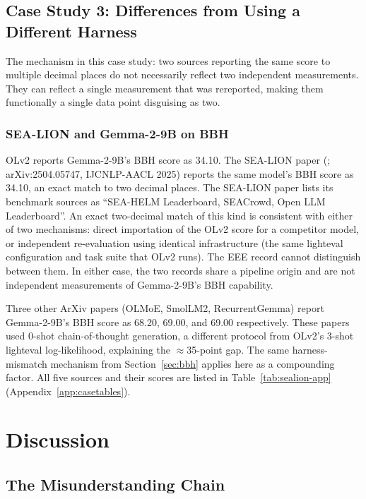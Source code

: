 \documentclass[11pt]{article}
\begin{document}
\subsection{Case Study 3: Differences from Using a Different Harness}
\label{sec:convergence}

The mechanism in this case study: two sources reporting the same score to
multiple decimal places do not necessarily reflect two independent
measurements. They can reflect a single measurement that was rereported,
making them functionally a single data point disguising as two.

\subsubsection{SEA-LION and Gemma-2-9B on BBH}
\label{sec:sealion}

OLv2 reports Gemma-2-9B's BBH score as 34.10. The SEA-LION paper
(\citealt{ng2025sealion}; arXiv:2504.05747, IJCNLP-AACL 2025) reports the
same model's BBH score as 34.10, an exact match to two decimal places.
The SEA-LION paper lists its benchmark sources as ``SEA-HELM Leaderboard,
SEACrowd, Open LLM Leaderboard''. An exact two-decimal match of this kind is
consistent with either of two mechanisms: direct importation of the OLv2
score for a competitor model, or independent re-evaluation using identical
infrastructure (the same lighteval configuration and task suite that OLv2
runs). The EEE record cannot distinguish between them. In either case, the
two records share a pipeline origin and are not independent measurements of
Gemma-2-9B's BBH capability.

Three other ArXiv papers (OLMoE, SmolLM2, RecurrentGemma) report
Gemma-2-9B's BBH score as 68.20, 69.00, and 69.00 respectively. These
papers used 0-shot chain-of-thought generation, a different protocol from
OLv2's 3-shot lighteval log-likelihood, explaining the $\approx$35-point
gap. The same harness-mismatch mechanism from Section~\ref{sec:bbh}
applies here as a compounding factor. All five sources and their scores
are listed in Table~\ref{tab:sealion-app} (Appendix~\ref{app:casetables}).


\section{Discussion}

\subsection{The Misunderstanding Chain}
\end{document}
